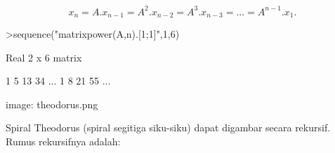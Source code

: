 \documentclass{article}
\begin{document}
\begin{eulernotebook}
\begin{eulercomment}
\begin{eulercomment}
\begin{eulercomment}
\begin{eulercomment}
\begin{eulercomment}
\begin{eulercomment}
\begin{eulercomment}
\begin{eulercomment}
\begin{eulercomment}
\begin{eulercomment}
\begin{eulercomment}
\begin{eulercomment}
\begin{eulercomment}
\begin{eulercomment}
\begin{eulercomment}
\begin{eulercomment}
\begin{eulercomment}
\begin{eulercomment}
\begin{eulercomment}
\begin{eulercomment}
\begin{eulercomment}
\begin{eulercomment}
\begin{eulercomment}
\begin{eulercomment}
\begin{eulercomment}
\begin{eulercomment}
\begin{eulercomment}
\begin{eulercomment}
\begin{eulercomment}
\end{eulercomment}
\begin{eulerformula}
\[
x_n=A.x_{n-1}=A^2.x_{n-2}=A^3.x_{n-3}= ... = A^{n-1}.x_1.
\]
\end{eulerformula}
\begin{eulerprompt}
>sequence("matrixpower(A,n).[1;1]",1,6)
\end{eulerprompt}
\begin{euleroutput}
  Real 2 x 6 matrix
  
              1             5            13            34     ...
              1             8            21            55     ...
\end{euleroutput}
\begin{eulercomment}
\begin{eulercomment}
\begin{eulercomment}
image: theodorus.png

Spiral Theodorus (spiral segitiga siku-siku) dapat digambar secara
rekursif. Rumus rekursifnya adalah:


\end{eulercomment}
\end{eulercomment}
\end{eulercomment}
\end{eulercomment}
\end{eulercomment}
\end{eulercomment}
\end{eulercomment}
\end{eulercomment}
\end{eulercomment}
\end{eulercomment}
\end{eulercomment}
\end{eulercomment}
\end{eulercomment}
\end{eulercomment}
\end{eulercomment}
\end{eulercomment}
\end{eulercomment}
\end{eulercomment}
\end{eulercomment}
\end{eulercomment}
\end{eulercomment}
\end{eulercomment}
\end{eulercomment}
\end{eulercomment}
\end{eulercomment}
\end{eulercomment}
\end{eulercomment}
\end{eulercomment}
\end{eulercomment}
\end{eulercomment}
\end{eulercomment}
\end{eulernotebook}
\end{document}
